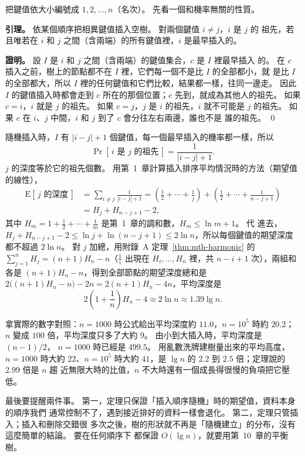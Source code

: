 \begin{whybox}[平均深度大約是 $2 \ln n$]
把鍵值依大小編號成 $1, 2, \ldots, n$（名次）。 先看一個和機率無關的性質。

\textbf{引理。} 依某個順序把相異鍵值插入空樹。 對兩個鍵值 $i \ne j$，$i$ 是 $j$ 的
祖先，若且唯若在 $i$ 和 $j$ 之間（含兩端）的所有鍵值裡，$i$ 是最早插入的。

\textbf{證明。} 設 $I$ 是 $i$ 和 $j$ 之間（含兩端）的鍵值集合，$c$ 是 $I$ 裡最早插入
的。 在 $c$ 插入之前，樹上的節點都不在 $I$ 裡，它們每一個不是比 $I$ 的全部都小，就
是比 $I$ 的全部都大，所以 $I$ 裡的任何鍵值和它們比較，結果都一樣，往同一邊走。
因此 $I$ 的鍵值插入時都會走到 $c$ 所在的那個位置；$c$ 先到，就成為其他人的祖先。
如果 $c = i$，$i$ 就是 $j$ 的祖先。 如果 $c = j$，$j$ 是 $i$ 的祖先，$i$ 就不可能是
$j$ 的祖先。 如果 $c$ 在 $i$、$j$ 中間，$i$ 和 $j$ 到了 $c$ 會分往左右兩邊，誰也不是
誰的祖先。 \qed

隨機插入時，$I$ 有 $|i - j| + 1$ 個鍵值，每一個最早插入的機率都一樣，所以
\[
\Pr[\,i \text{ 是 } j \text{ 的祖先}\,] = \frac{1}{|i - j| + 1}.
\]
$j$ 的深度等於它的祖先個數。 用第~1~章計算插入排序平均情況時的方法（期望值的線性），
\begin{align*}
\mathrm{E}[\,j \text{ 的深度}\,]
&= \sum_{i \ne j} \frac{1}{|i - j| + 1}
= \left(\frac12 + \cdots + \frac1j\right) + \left(\frac12 + \cdots + \frac{1}{n-j+1}\right) \\
&= H_j + H_{n-j+1} - 2,
\end{align*}
其中 $H_m = 1 + \frac12 + \cdots + \frac1m$ 是第~1~章的調和數，$H_m \le \ln m + 1$。 代
進去，$H_j + H_{n-j+1} - 2 \le \ln j + \ln(n-j+1) \le 2 \ln n$，所以每個鍵值的期望深度
都不超過 $2 \ln n$。 對 $j$ 加總，用附錄~A 定理~\ref{thm:mth-harmonic} 的
$\sum_{j=1}^{n} H_j = (n+1)H_n - n$（$\frac1i$ 出現在 $H_i, \ldots, H_n$ 裡，共
$n - i + 1$ 次），兩組和各是 $(n+1)H_n - n$，得到全部節點的期望深度總和是
$2\bigl((n+1)H_n - n\bigr) - 2n = 2(n+1)H_n - 4n$，平均深度是
\[
2\left(1 + \frac1n\right) H_n - 4 \approx 2 \ln n \approx 1.39 \lg n.
\]
\end{whybox}

拿實際的數字對照：$n = 1000$ 時公式給出平均深度約 $11.0$，$n = 10^5$ 時約 $20.2$；
$n$ 變成 $100$ 倍，平均深度只多了大約 $9$。 由小到大插入時，平均深度是 $(n-1)/2$，
$n = 1000$ 時已經是 $499.5$。 用亂數洗牌建樹量出來的平均高度，$n = 1000$ 時大約
$22$、$n = 10^5$ 時大約 $41$，是 $\lg n$ 的 $2.2$ 到 $2.5$ 倍；定理說的 $2.99$ 倍是 $n$ 趨
近無限大時的比值，$n$ 不大時還有一個成長得很慢的負項把它壓低。

最後要提醒兩件事。 第一，定理只保證「插入順序隨機」時的期望值，資料本身的順序我們
通常控制不了，遇到接近排好的資料一樣會退化。 第二，定理只管插入；插入和刪除交錯很
多次之後，樹的形狀就不再是「隨機建立」的分布，沒有這麼簡單的結論。 要在任何順序下
都保證 $O(\lg n)$，就要用第~10~章的平衡樹。

